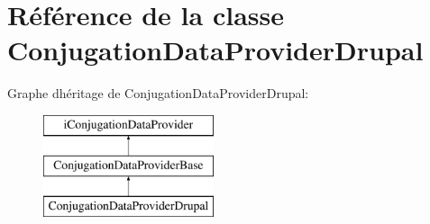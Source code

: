 \hypertarget{classConjugationDataProviderDrupal}{}\section{Référence de la classe Conjugation\+Data\+Provider\+Drupal}
\label{classConjugationDataProviderDrupal}
Graphe d\textquotesingle{}héritage de Conjugation\+Data\+Provider\+Drupal\+:\begin{figure}[H]
\begin{center}
\leavevmode
\includegraphics[height=3.000000cm]{classConjugationDataProviderDrupal}
\end{center}
\end{figure}
